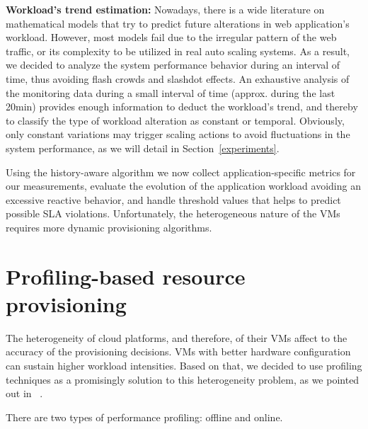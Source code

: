 \textbf{Workload's trend estimation:} Nowadays, there is a wide literature on mathematical models that try to predict future alterations in web application's workload. However, most models fail due to the irregular pattern of the web traffic, or its complexity to be utilized in real auto scaling systems. As a result, we decided to analyze the system performance behavior during an interval of time, thus avoiding flash crowds and slashdot effects. An exhaustive analysis of the monitoring data during a small interval of time (approx. during the last 20min) provides enough information to deduct the workload's trend, and thereby to classify the type of workload alteration as constant or temporal. Obviously, only constant variations may trigger scaling actions to avoid fluctuations in the system performance, as we will detail in Section~\ref{experiments}.

Using the history-aware algorithm we now collect application-specific metrics for our measurements, evaluate the evolution of the application workload avoiding an excessive reactive behavior, and handle threshold values that helps to predict possible SLA violations. Unfortunately, the heterogeneous nature of the VMs requires more dynamic provisioning algorithms. 



\section*{Profiling-based resource provisioning}

The heterogeneity of cloud platforms, and therefore, of their VMs affect to the accuracy of the provisioning decisions. VMs with better hardware configuration can sustain higher workload intensities. Based on that, we decided to use profiling techniques as a promisingly solution to this heterogeneity problem,  as we pointed out in ~\cite{jiangThesis}. 

\noindent There are two types of performance profiling: offline and online.

